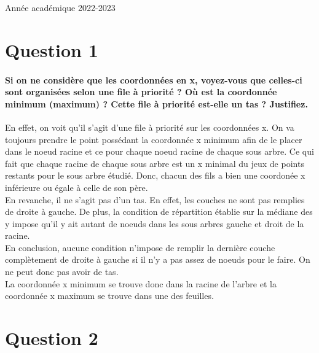\documentclass{article}
\begin{document}
\begin{titlepage}
\begin{center}
        {\large Année académique 2022-2023}
        
    \end{center}
\end{titlepage}

\tableofcontents

\newpage

\section{Question 1}
    \paragraph{Si on ne considère que les coordonnées en x, voyez-vous que celles-ci sont organisées selon
    une file à priorité ? Où est la coordonnée minimum (maximum) ? Cette file à priorité est-elle
    un tas ? Justifiez.}
    En effet, on voit qu'il s'agit d'une file à priorité sur les coordonnées x. On va toujours prendre le point possédant la coordonnée x minimum
    afin de le placer dans le noeud racine et ce pour chaque noeud racine de chaque sous arbre. Ce qui fait que chaque racine de chaque sous arbre est un x minimal du
    jeux de points restants pour le sous arbre étudié. Donc, chacun des fils a bien une coordonée x inférieure ou égale à celle de son père.\\
    En revanche, il ne s'agit pas d'un tas. En effet, les couches ne sont pas remplies de droite à gauche. De plus, la condition de répartition établie
    sur la médiane des y impose qu'il y ait autant de noeuds dans les sous arbres gauche et droit de la racine.\\ En conclusion, aucune condition
    n'impose de remplir la dernière couche complètement de droite à gauche si il n'y a pas assez de noeuds pour le faire. On ne peut donc pas avoir de tas.\\
    La coordonnée x minimum se trouve donc dans la racine de l'arbre et la 
    coordonnée x maximum se trouve dans une des feuilles.

\section{Question 2}
\end{document}

